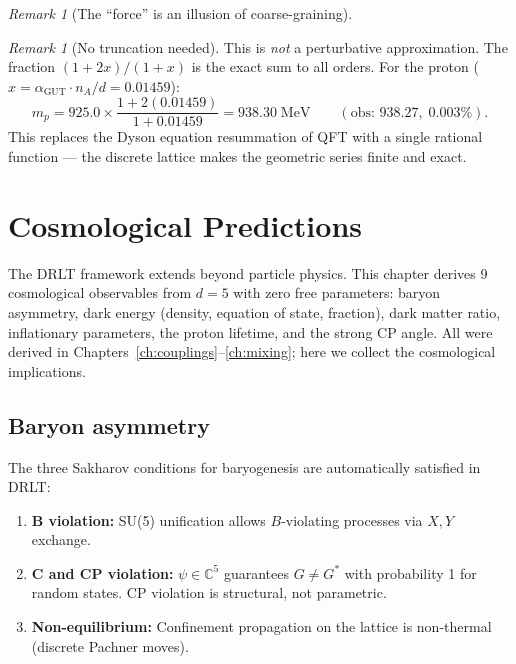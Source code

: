 \documentclass[12pt]{article}
\theoremstyle{remark}
\newtheorem{remark}[theorem]{Remark}
\theoremstyle{definition}
\newcommand{\CC}{\mathbb{C}}
\newcommand{\agut}{\alpha_{\mathrm{GUT}}}
\begin{document}
\begin{remark}[The ``force'' is an illusion of coarse-graining]
\begin{remark}[No truncation needed]
This is \emph{not} a perturbative approximation.  The fraction $(1+2x)/(1+x)$ is the exact sum to all orders.  For the proton ($x = \agut \cdot n_A/d = 0.01459$):
\begin{equation}
m_p = 925.0 \times \frac{1 + 2(0.01459)}{1 + 0.01459} = 938.30\;\text{MeV}
\qquad (\text{obs: } 938.27,\; 0.003\%).
\end{equation}
This replaces the Dyson equation resummation of QFT with a single rational function --- the discrete lattice makes the geometric series finite and exact.
\end{remark}



\section{Cosmological Predictions}
\label{ch:cosmology}

The DRLT framework extends beyond particle physics. This chapter derives 9 cosmological observables from $d = 5$ with zero free parameters: baryon asymmetry, dark energy (density, equation of state, fraction), dark matter ratio, inflationary parameters, the proton lifetime, and the strong CP angle. All were derived in Chapters~\ref{ch:couplings}--\ref{ch:mixing}; here we collect the cosmological implications.

\subsection{Baryon asymmetry}

The three Sakharov conditions for baryogenesis are automatically satisfied in DRLT:
\begin{enumerate}
\item \textbf{B violation:} SU(5) unification allows $B$-violating processes via $X, Y$ exchange.
\item \textbf{C and CP violation:} $\psi \in \CC^5$ guarantees $G \neq G^*$ with probability 1 for random states. CP violation is structural, not parametric.
\item \textbf{Non-equilibrium:} Confinement propagation on the lattice is non-thermal (discrete Pachner moves).
\end{enumerate}


\end{remark}
\end{document}
